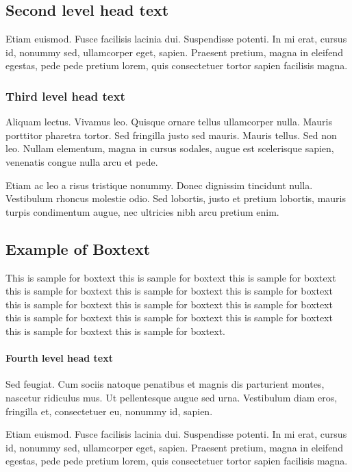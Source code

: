 \documentclass[proof]{WileyASNA-v1}
\begin{document}
\subsection{Second level head text}

Etiam euismod. Fusce facilisis lacinia dui. Suspendisse potenti. In mi erat, cursus id, nonummy sed, ullamcorper
eget, sapien. Praesent pretium, magna in eleifend egestas, pede pede pretium lorem, quis consectetuer tortor sapien
facilisis magna. 

\subsubsection{Third level head text}

Aliquam lectus. Vivamus leo. Quisque ornare tellus ullamcorper nulla. Mauris porttitor pharetra tortor. Sed fringilla
justo sed mauris. Mauris tellus. Sed non leo. Nullam elementum, magna in cursus sodales, augue est scelerisque
sapien, venenatis congue nulla arcu et pede. 

Etiam ac leo a risus tristique nonummy. Donec dignissim tincidunt nulla. Vestibulum rhoncus molestie odio. Sed
lobortis, justo et pretium lobortis, mauris turpis condimentum augue, nec ultricies nibh arcu pretium enim. 


\begin{boxtext}
\section*{Example of Boxtext}%
This is sample for boxtext this is sample for boxtext this is sample for boxtext this is sample for boxtext this is sample for boxtext this is sample for boxtext this is sample for boxtext this is sample for boxtext this is sample for boxtext this is sample for boxtext this is sample for boxtext this is sample for boxtext this is sample for boxtext this is sample for boxtext.
\end{boxtext}


\paragraph{Fourth level head text}

Sed feugiat. Cum sociis natoque penatibus et magnis dis parturient montes, nascetur ridiculus mus. Ut pellentesque
augue sed urna. Vestibulum diam eros, fringilla et, consectetuer eu, nonummy id, sapien. 

Etiam euismod. Fusce facilisis lacinia dui. Suspendisse potenti. In mi erat, cursus id, nonummy sed, ullamcorper
eget, sapien. Praesent pretium, magna in eleifend egestas, pede pede pretium lorem, quis consectetuer tortor sapien
facilisis magna. 
\end{document}
